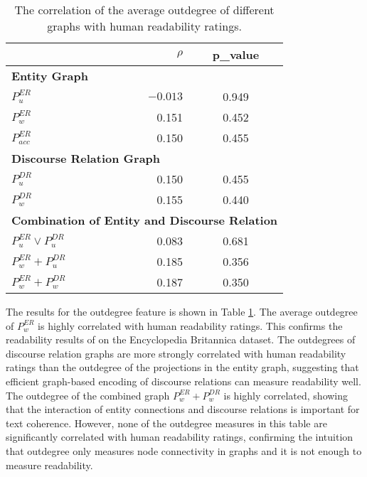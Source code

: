 \begin{table}[!t]
\centering
\begin{small}
\begin{tabular}{lrc}
\hline
                        & $\rho$                & p\_value\\\hline
        \multicolumn{3}{l}{\textbf{Entity Graph}}\\
 $P_u^{ER}$             & $-0.013$ & 0.949 \\
 $P_w^{ER}$             & 0.151  & 0.452\\
 $P_{acc}^{ER}$ & 0.150         & 0.455\\
\hline
\multicolumn{3}{l}{\textbf{Discourse Relation Graph}}\\
 $P_u^{DR}$ &  0.150 & 0.455\\
 $P_w^{DR}$ &  0.155  & 0.440\\\hline
 \multicolumn{3}{l}{\textbf{Combination of Entity and Discourse Relation}}\\
 $P_u^{ER} \lor P_u^{DR}$  &  0.083 & 0.681\\
 $P_w^{ER} + P_u^{DR}$ & 0.185  & 0.356\\
 $P_w^{ER} + P_w^{DR}$ & 0.187  & 0.350\\\hline
\end{tabular}
\end{small}
\caption{The correlation of the average outdegree of different graphs with human readability ratings.}
  \label{t:OD_pearson}
\end{table}

The results for the outdegree feature is shown in Table \ref{t:OD_pearson}.
The average outdegree of $P_w^{ER}$ is highly correlated with human readability ratings. This confirms the readability results of
 on the Encyclopedia Britannica dataset. 
The outdegrees of discourse relation graphs are more strongly correlated with human readability ratings than the outdegree of the projections in the entity graph, suggesting that efficient graph-based encoding of discourse relations can measure readability well.
The outdegree of the combined graph $P_w^{ER}+P_w^{DR}$ is highly correlated, showing that the interaction of entity connections and discourse relations is important for text coherence.
However, none of the outdegree measures in this table are significantly correlated with human readability ratings, confirming the intuition that outdegree only measures node connectivity in graphs and it is not enough to measure readability.

